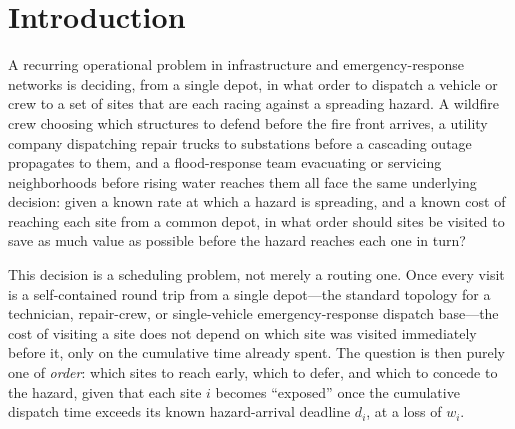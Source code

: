 \documentclass[pdflatex,sn-mathphys-ay]{sn-jnl}
\theoremstyle{thmstyleone}
\theoremstyle{thmstyletwo}
\theoremstyle{thmstylethree}
\begin{document}
\section{Introduction}\label{sec:intro}

A recurring operational problem in infrastructure and emergency-response
networks is deciding, from a single depot, in what order to dispatch a
vehicle or crew to a set of sites that are each racing against a
spreading hazard. A wildfire crew choosing which structures to defend
before the fire front arrives, a utility company dispatching repair
trucks to substations before a cascading outage propagates to them, and
a flood-response team evacuating or servicing neighborhoods before
rising water reaches them all face the same underlying decision: given
a known rate at which a hazard is spreading, and a known cost of
reaching each site from a common depot, in what order should sites be
visited to save as much value as possible before the hazard reaches
each one in turn?

This decision is a scheduling problem, not merely a routing one. Once
every visit is a self-contained round trip from a single depot---the
standard topology for a technician, repair-crew, or single-vehicle
emergency-response dispatch base---the cost of visiting a site does not
depend on which site was visited immediately before it, only on the
cumulative time already spent. The question is then purely one of
\emph{order}: which sites to reach early, which to defer, and which to
concede to the hazard, given that each site $i$ becomes ``exposed''
once the cumulative dispatch time exceeds its known hazard-arrival
deadline $d_i$, at a loss of $w_i$.
\end{document}
